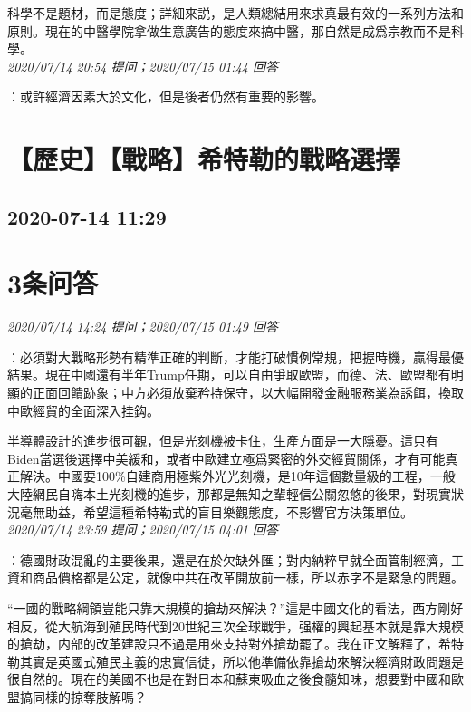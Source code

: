 \documentclass[twocolumn]{ctexart}
\begin{document}
科學不是題材，而是態度；詳細來説，是人類總結用來求真最有效的一系列方法和原則。現在的中醫學院拿做生意廣告的態度來搞中醫，那自然是成爲宗教而不是科學。
\\

\textit{\hfill\noindent\small 2020/07/14 20:54 提问；2020/07/15 01:44 回答}

：或許經濟因素大於文化，但是後者仍然有重要的影響。
\\


\section{【歷史】【戰略】希特勒的戰略選擇}
\subsection{2020-07-14 11:29}


\section{3条问答}

\textit{\hfill\noindent\small 2020/07/14 14:24 提问；2020/07/15 01:49 回答}

：必須對大戰略形勢有精準正確的判斷，才能打破慣例常規，把握時機，贏得最優結果。現在中國還有半年Trump任期，可以自由爭取歐盟，而德、法、歐盟都有明顯的正面回饋跡象；中方必須放棄矜持保守，以大幅開發金融服務業為誘餌，換取中歐經貿的全面深入挂鈎。

半導體設計的進步很可觀，但是光刻機被卡住，生產方面是一大隱憂。這只有Biden當選後選擇中美緩和，或者中歐建立極爲緊密的外交經貿關係，才有可能真正解決。中國要100\%自建商用極紫外光光刻機，是10年這個數量級的工程，一般大陸網民自嗨本土光刻機的進步，那都是無知之輩輕信公關忽悠的後果，對現實狀況毫無助益，希望這種希特勒式的盲目樂觀態度，不影響官方決策單位。
\\

\textit{\hfill\noindent\small 2020/07/14 23:59 提问；2020/07/15 04:01 回答}

：德國財政混亂的主要後果，還是在於欠缺外匯；對内納粹早就全面管制經濟，工資和商品價格都是公定，就像中共在改革開放前一樣，所以赤字不是緊急的問題。

“一國的戰略綱領豈能只靠大規模的搶劫來解決？”這是中國文化的看法，西方剛好相反，從大航海到殖民時代到20世紀三次全球戰爭，强權的興起基本就是靠大規模的搶劫，内部的改革建設只不過是用來支持對外搶劫罷了。我在正文解釋了，希特勒其實是英國式殖民主義的忠實信徒，所以他準備依靠搶劫來解決經濟財政問題是很自然的。現在的美國不也是在對日本和蘇東吸血之後食髓知味，想要對中國和歐盟搞同樣的掠奪肢解嗎？
\end{document}
